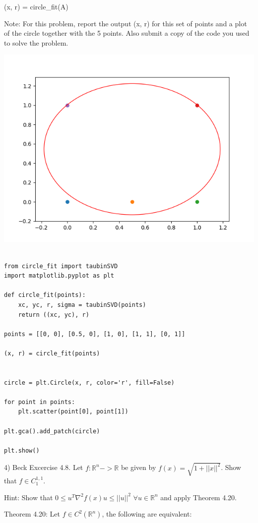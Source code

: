 \documentclass{article}
\newcommand{\RR}{\mathbb{R}}
\begin{document}
(x, r) = circle\_fit(A)

Note: For this problem, report the output (x, r) for this set of points
and a plot of the circle together with the 5 points. Also submit a copy of the code
you used to solve the problem.

\includegraphics{problem_3_3_plot}

\begin{lstlisting}

from circle_fit import taubinSVD
import matplotlib.pyplot as plt

def circle_fit(points):
    xc, yc, r, sigma = taubinSVD(points)
    return ((xc, yc), r)

points = [[0, 0], [0.5, 0], [1, 0], [1, 1], [0, 1]]

(x, r) = circle_fit(points)


circle = plt.Circle(x, r, color='r', fill=False)

for point in points:
    plt.scatter(point[0], point[1])

plt.gca().add_patch(circle)

plt.show()

\end{lstlisting}


4) Beck Excercise 4.8. Let $f : \RR^n -> \RR$ be given by $f(x) = \sqrt{1 + ||x||^2}$.
Show that $f \in C_1^{1,1}$.

Hint: Show that $0 \leq u^T \nabla^2 f(x) u \leq ||u||^2$ $\forall u \in \RR^n$
and apply Theorem 4.20.


Theorem 4.20: Let $f \in C^2(\RR^n)$, the following are equivalent:
\end{document}
